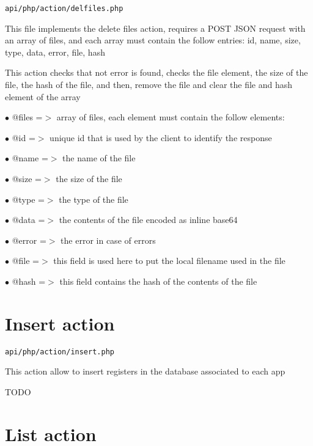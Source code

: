 \documentclass[a4paper]{book}
\begin{document}
\begin{lstlisting}
api/php/action/delfiles.php
\end{lstlisting}

This file implements the delete files action, requires a POST JSON request
with an array of files, and each array must contain the follow entries:
id, name, size, type, data, error, file, hash

This action checks that not error is found, checks the file element, the
size of the file, the hash of the file, and then, remove the file and
clear the file and hash element of the array

\begin{compactitem}
\item[\color{myblue}$\bullet$] @files =$>$ array of files, each element must contain the follow elements:
\item[\color{myblue}$\bullet$] @id    =$>$ unique id that is used by the client to identify the response
\item[\color{myblue}$\bullet$] @name  =$>$ the name of the file
\item[\color{myblue}$\bullet$] @size  =$>$ the size of the file
\item[\color{myblue}$\bullet$] @type  =$>$ the type of the file
\item[\color{myblue}$\bullet$] @data  =$>$ the contents of the file encoded as inline base64
\item[\color{myblue}$\bullet$] @error =$>$ the error in case of errors
\item[\color{myblue}$\bullet$] @file  =$>$ this field is used here to put the local filename used in the file
\item[\color{myblue}$\bullet$] @hash  =$>$ this field contains the hash of the contents of the file
\end{compactitem}

\hypertarget{toc14}{}
\section{Insert action}

\begin{lstlisting}
api/php/action/insert.php
\end{lstlisting}

This action allow to insert registers in the database associated to
each app

TODO

\hypertarget{toc15}{}
\section{List action}
\end{document}
